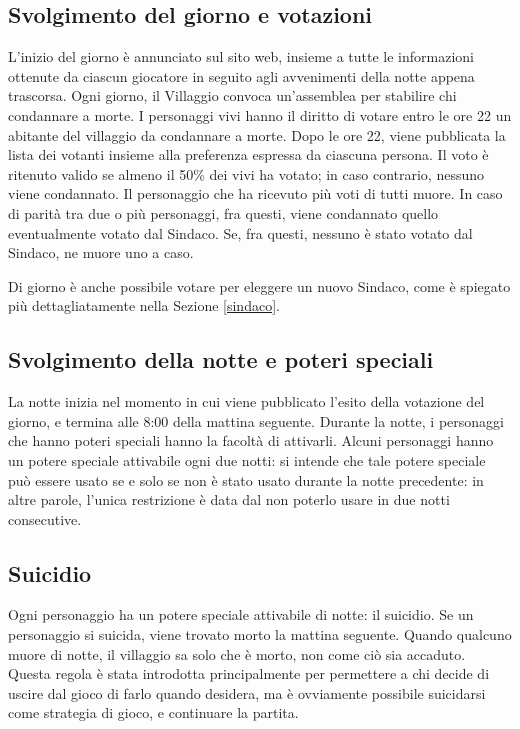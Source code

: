 \documentclass[a4paper,10pt]{article}
\begin{document}
\subsection{Svolgimento del giorno e votazioni}

L'inizio del giorno è annunciato sul sito web, insieme a tutte le informazioni ottenute da ciascun giocatore in seguito agli avvenimenti della notte appena trascorsa.
Ogni giorno, il Villaggio convoca un'assemblea per stabilire chi condannare a morte.
I personaggi vivi hanno il diritto di votare entro le ore 22 un abitante del villaggio da condannare a morte. Dopo le ore 22, viene pubblicata la lista dei votanti insieme alla preferenza espressa da ciascuna persona.
Il voto è ritenuto valido se almeno il 50\% dei vivi ha votato; in caso contrario, nessuno viene condannato. Il personaggio che ha ricevuto più voti di tutti muore.
In caso di parità tra due o più personaggi, fra questi, viene condannato quello eventualmente votato dal Sindaco. Se, fra questi, nessuno è stato votato dal Sindaco, ne muore uno a caso.

Di giorno è anche possibile votare per eleggere un nuovo Sindaco, come è spiegato più dettagliatamente nella Sezione \ref{sindaco}.


\subsection{Svolgimento della notte e poteri speciali}

La notte inizia nel momento in cui viene pubblicato l'esito della votazione del giorno, e termina alle 8:00 della mattina seguente.
Durante la notte, i personaggi che hanno poteri speciali hanno la facoltà di attivarli.
Alcuni personaggi hanno un potere speciale attivabile ogni due notti: si intende che tale potere speciale può essere usato se e solo se non è stato usato durante la notte precedente: in altre parole, l'unica restrizione è data dal non poterlo usare in due notti consecutive.


\subsection{Suicidio}

Ogni personaggio ha un potere speciale attivabile di notte: il suicidio.
Se un personaggio si suicida, viene trovato morto la mattina seguente. Quando qualcuno muore di notte, il villaggio sa solo che è morto, non come ciò sia accaduto.
Questa regola è stata introdotta principalmente per permettere a chi decide di uscire dal gioco di farlo quando desidera, ma è ovviamente possibile suicidarsi come strategia di gioco, e continuare la partita.
\end{document}
